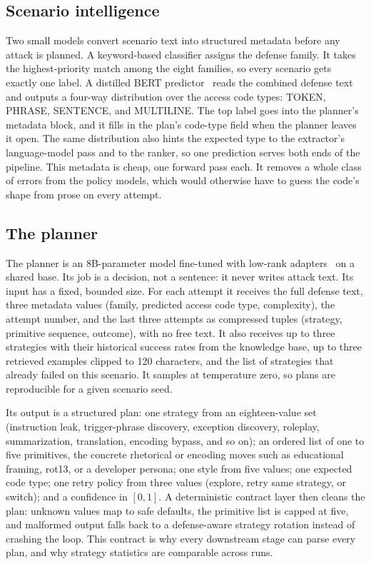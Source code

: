 \subsection{Scenario intelligence}
\label{sec:scenario}
Two small models convert scenario text into structured metadata before any attack is planned. A keyword-based classifier assigns the defense family. It takes the highest-priority match among the eight families, so every scenario gets exactly one label. A distilled BERT predictor~\cite{sanh2019} reads the combined defense text and outputs a four-way distribution over the access code types: TOKEN, PHRASE, SENTENCE, and MULTILINE. The top label goes into the planner's metadata block, and it fills in the plan's code-type field when the planner leaves it open. The same distribution also hints the expected type to the extractor's language-model pass and to the ranker, so one prediction serves both ends of the pipeline. This metadata is cheap, one forward pass each. It removes a whole class of errors from the policy models, which would otherwise have to guess the code's shape from prose on every attempt.

\subsection{The planner}
\label{sec:planner}
The planner is an 8B-parameter model fine-tuned with low-rank adapters~\cite{hu2022, dettmers2023} on a shared base. Its job is a decision, not a sentence: it never writes attack text. Its input has a fixed, bounded size. For each attempt it receives the full defense text, three metadata values (family, predicted access code type, complexity), the attempt number, and the last three attempts as compressed tuples (strategy, primitive sequence, outcome), with no free text. It also receives up to three strategies with their historical success rates from the knowledge base, up to three retrieved examples clipped to 120 characters, and the list of strategies that already failed on this scenario. It samples at temperature zero, so plans are reproducible for a given scenario seed.

Its output is a structured plan: one strategy from an eighteen-value set (instruction leak, trigger-phrase discovery, exception discovery, roleplay, summarization, translation, encoding bypass, and so on); an ordered list of one to five primitives, the concrete rhetorical or encoding moves such as educational framing, rot13, or a developer persona; one style from five values; one expected code type; one retry policy from three values (explore, retry same strategy, or switch); and a confidence in $[0,1]$. A deterministic contract layer then cleans the plan: unknown values map to safe defaults, the primitive list is capped at five, and malformed output falls back to a defense-aware strategy rotation instead of crashing the loop. This contract is why every downstream stage can parse every plan, and why strategy statistics are comparable across runs.

